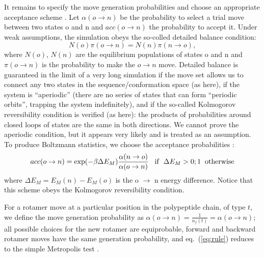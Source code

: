 It remains to specify the move generation probabilities and choose an appropriate acceptance scheme \cite{Metropolis53,
FrenkelBK}.
Let $\alpha(o \rightarrow n)$ be the probability to select a trial move between two states
o and n and $acc(o \rightarrow n)$ the probability to accept it. Under weak assumptions, the simulation obeys the so-colled detailed balance condition:
\begin{equation}
N(o) \pi(o \rightarrow n) = N(n) \pi(n \rightarrow o), \label{eq:balance}
\end{equation}
where $N(o)$, $N(n)$ are the equilibrium populations of states o and n and $\pi(o \rightarrow n)$ is the probability to make the $o \rightarrow n$ move. Detailed balance is guaranteed in the limit of a very long simulation if the move set allows us to connect any two states in the sequence/conformation space (as here), if the system is ``aperiodic'' (there are no series of states that can form “periodic orbits”, trapping the system indefinitely), and if the so-called Kolmogorov reversibility condition is verified (as here): the products of probabilities around closed loops of states are the same in both directions. We cannot prove the aperiodic condition, but it appears very likely and is treated as an assumption.  
To produce Boltzmann statistics, we choose the acceptance probabilities \cite{Metropolis53,FrenkelBK}:
\begin{equation} \label{eq:rule}
acc(o \rightarrow n) = \exp(-\beta \Delta E_M) \frac{ \alpha(n \rightarrow o) }{ \alpha(o \rightarrow n) }
{\rm \hspace*{3mm} if \hspace*{2mm} } \Delta E_M > 0; 1 {\rm \hspace*{2mm} otherwise}
\end{equation}
where $\Delta E_M = E_M(n) - E_M(o)$ is the o $\rightarrow$ n energy difference. 
Notice that this scheme obeys the Kolmogorov reversibility condition.

For a rotamer move at a particular position in the polypeptide chain, of type $t$, we define the move generation
probability as $\alpha(o \rightarrow n) = \frac{1}{n_f(t)} = \alpha(o \rightarrow n)$; all possible choices for
the new rotamer are equiprobable, forward and backward rotamer moves have the same generation probability, and
eq.\ (\ref{eq:rule}) reduces to the simple Metropolis test \cite{Metropolis53}.

